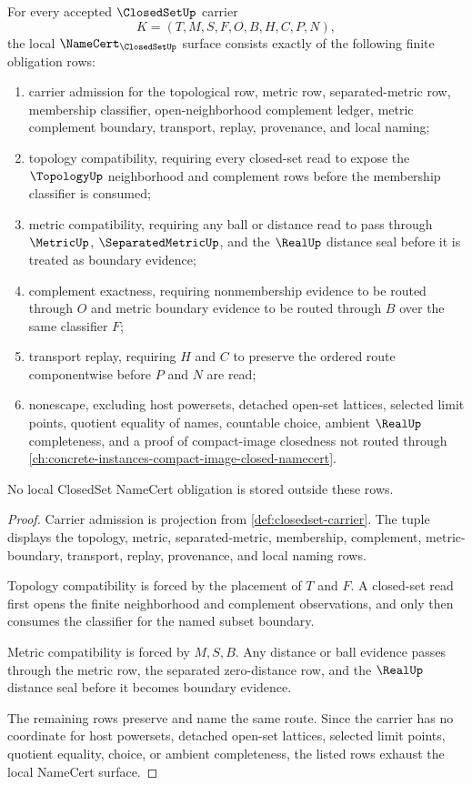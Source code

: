 \begin{theorem}\label{thm:closedset-namecert-obligations}
For every accepted $\ClosedSetUp$ carrier
$$
K=(T,M,S,F,O,B,H,C,P,N),
$$
the local $\NameCert_{\ClosedSetUp}$ surface consists exactly of the following finite obligation rows:
\begin{enumerate}
\item carrier admission for the topological row, metric row, separated-metric row, membership classifier, open-neighborhood complement ledger, metric complement boundary, transport, replay, provenance, and local naming;
\item topology compatibility, requiring every closed-set read to expose the $\TopologyUp$ neighborhood and complement rows before the membership classifier is consumed;
\item metric compatibility, requiring any ball or distance read to pass through $\MetricUp$, $\SeparatedMetricUp$, and the $\RealUp$ distance seal before it is treated as boundary evidence;
\item complement exactness, requiring nonmembership evidence to be routed through $O$ and metric boundary evidence to be routed through $B$ over the same classifier $F$;
\item transport replay, requiring $H$ and $C$ to preserve the ordered route componentwise before $P$ and $N$ are read;
\item nonescape, excluding host powersets, detached open-set lattices, selected limit points, quotient equality of names, countable choice, ambient $\RealUp$ completeness, and a proof of compact-image closedness not routed through \autoref{ch:concrete-instances-compact-image-closed-namecert}.
\end{enumerate}
No local ClosedSet NameCert obligation is stored outside these rows.
\end{theorem}
\begin{proof}
Carrier admission is projection from \autoref{def:closedset-carrier}. The tuple displays the topology, metric, separated-metric, membership, complement, metric-boundary, transport, replay, provenance, and local naming rows.

Topology compatibility is forced by the placement of $T$ and $F$. A closed-set read first opens the finite neighborhood and complement observations, and only then consumes the classifier for the named subset boundary.

Metric compatibility is forced by $M,S,B$. Any distance or ball evidence passes through the metric row, the separated zero-distance row, and the $\RealUp$ distance seal before it becomes boundary evidence.

The remaining rows preserve and name the same route. Since the carrier has no coordinate for host powersets, detached open-set lattices, selected limit points, quotient equality, choice, or ambient completeness, the listed rows exhaust the local NameCert surface.
\end{proof}

